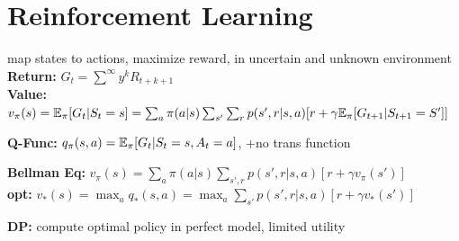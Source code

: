 \section{Reinforcement Learning}
map states to actions, maximize reward, in uncertain and unknown environment\\


\textbf{Return:} $G_t = \sum^\infty y^k R_{t+k+1}$\\
\textbf{Value:} $v_\pi(s) = \mathbb{E}_\pi[G_t | S_t = s] \\
= \sum_a \pi(a|s) \sum_{s'} \sum_r p(s', r| s,a)[r + \gamma \mathbb{E}_\pi[G_{t+1} | S_{t+1} = S']]$\\

\textbf{Q-Func:} $q_\pi(s, a) = \mathbb{E}_\pi[G_t | S_t = s, A_t = a]$, +no trans function\\

\textbf{Bellman Eq:} $v_\pi(s) = \sum_a \pi(a|s) \sum_{s', r} p(s', r| s,a)[r + \gamma v_\pi(s')]$\\
\textbf{opt:} $v_*(s) = \max_a q_*(s,a) = \max_a \sum_{s'} p(s', r| s,a)[r + \gamma v_*(s')]$\\

\textbf{DP:} compute optimal policy in perfect model, limited utility\\

